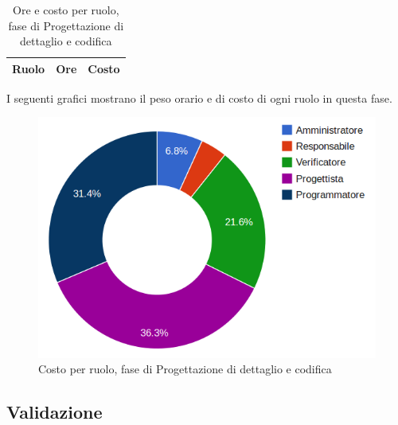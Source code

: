\begin{table}[H]
	\centering
	\begin{tabular}{ l c c }
	\textbf{Ruolo} & \textbf{Ore} & \textbf{Costo} \\
	\hline
	
		
	
	\end{tabular}
	\caption{Ore e costo per ruolo, fase di Progettazione di dettaglio e codifica}
	\end{table}

I seguenti grafici mostrano il peso orario e di costo di ogni ruolo in questa fase.

\begin{tikzpicture}

	

\end{tikzpicture}


\begin{figure}[H]
\centering
\includegraphics[scale=0.35]{5-3-2.png}
\caption{Costo per ruolo, fase di Progettazione di dettaglio e codifica\label{fig:nome}}
\end{figure}

\subsection{Validazione}


